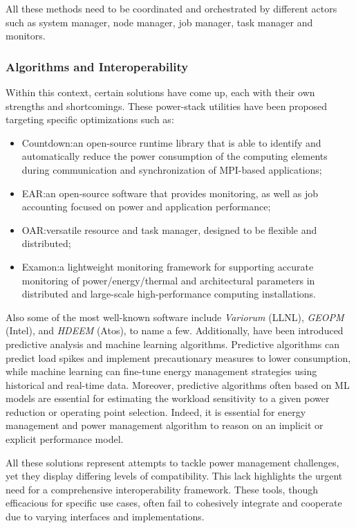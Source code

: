 \noindent All these methods need to be coordinated and orchestrated by different actors such as system manager, node manager, job manager, task manager and monitors.

\subsubsection{Algorithms and Interoperability}\label{SSEC:runtimes}

Within this context, certain solutions have come up, each with their own strengths and shortcomings. These power-stack utilities have been proposed targeting specific optimizations such as:
\begin{itemize}
    \item Countdown\cite{cesarini2019countdown}:\@ an open-source runtime library that is able to identify and automatically reduce the power consumption of the computing elements during communication and synchronization of MPI-based applications;
    \item EAR\cite{ear}:\@ an open-source software that provides monitoring, as well as job accounting focused on power and application performance;
    \item OAR\cite{oar}:\@ versatile resource and task manager, designed to be flexible and distributed;
    \item Examon\cite{Examon}:\@  a lightweight monitoring framework for supporting accurate monitoring of power/energy/thermal and architectural parameters in distributed and large-scale high-performance computing installations.
\end{itemize}

Also some of the most well-known software include \emph{Variorum} (LLNL), \emph{GEOPM} (Intel)\cite{GEOPM}, and \emph{HDEEM} (Atos)\cite{HDEEM}, to name a few.
Additionally, have been introduced predictive analysis and machine learning\cite{MLEC} algorithms. Predictive algorithms can predict load spikes and implement precautionary measures to lower consumption, while machine learning can fine-tune energy management strategies using historical and real-time data. Moreover, predictive algorithms often based on ML models are essential for estimating the workload sensitivity to a given power reduction or operating point selection. Indeed, it is essential for energy management and power management algorithm to reason on an implicit or explicit performance model.

All these solutions represent attempts to tackle power management challenges, yet they display differing levels of compatibility. This lack highlights the urgent need for a comprehensive interoperability framework. These tools, though efficacious for specific use cases, often fail to cohesively integrate and cooperate due to varying interfaces and implementations.

